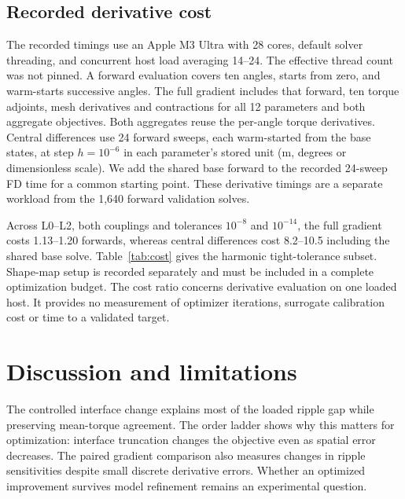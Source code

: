 \documentclass{anvil-paper}
\begin{document}
\subsection{Recorded derivative cost}
The recorded timings use an Apple M3 Ultra with 28 cores, default solver
threading, and concurrent host load averaging 14--24. The effective thread
count was not pinned. A forward evaluation covers ten angles, starts from
zero, and warm-starts successive angles. The full gradient includes that
forward, ten torque adjoints, mesh derivatives and contractions for all
12 parameters and both aggregate objectives. Both aggregates reuse the
per-angle torque derivatives. Central differences use 24 forward sweeps,
each warm-started from the base states, at step $h=10^{-6}$ in each
parameter's stored unit (m, degrees or dimensionless scale). We add the
shared base forward to the recorded 24-sweep FD time for a common starting
point. These derivative timings are a separate workload from the 1,640
forward validation solves.

Across L0--L2, both couplings and tolerances $10^{-8}$ and $10^{-14}$, the
full gradient costs 1.13--1.20 forwards, whereas central differences cost
8.2--10.5 including the shared base solve. Table~\ref{tab:cost} gives the harmonic tight-tolerance subset.
Shape-map setup is recorded separately and must be included in a complete
optimization budget. The cost ratio concerns derivative evaluation
on one loaded host. It provides no measurement of optimizer iterations,
surrogate calibration cost or time to a validated target.

\begin{table}[htbp]\centering\small
\caption{Recorded harmonic-model cost at relative tolerance $10^{-14}$,
initial design and full current. Times are seconds for ten-angle sweeps;
FD includes the shared base sweep, and setup is a one-time shape-map cost.}
\label{tab:cost}
\end{table}

\section{Discussion and limitations}
The controlled interface change explains most of the loaded ripple gap
while preserving mean-torque agreement. The order ladder shows why this
matters for optimization: interface truncation changes the objective even
as spatial error decreases. The paired gradient comparison also measures
changes in ripple sensitivities despite small discrete derivative errors.
Whether an optimized improvement survives model refinement remains an
experimental question.
\end{document}
